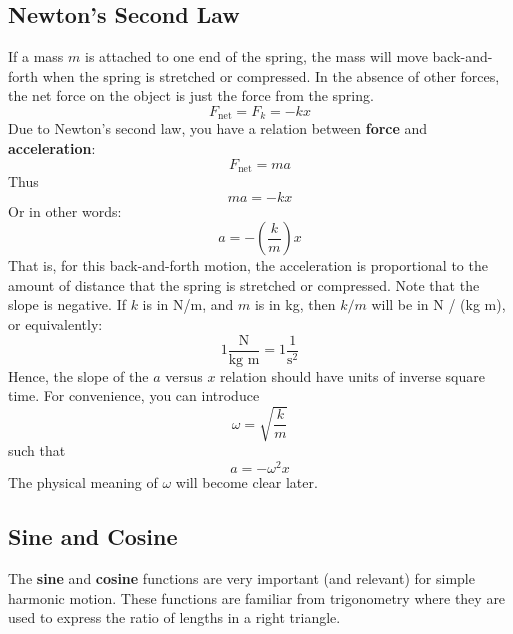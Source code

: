 \subsection{Newton's Second Law}
If a mass $m$ is attached to one end of the spring, the mass will move back-and-forth when the spring is stretched or compressed. In the absence of other forces, the net force on the object is just the force from the spring.
\begin{equation}
    F_{\text{net}} = F_{k} = -kx
\end{equation}
Due to Newton's second law, you have a relation between \textbf{force} and \textbf{acceleration}:
\begin{equation}
    F_{\text{net}} = m a
\end{equation}
Thus
\begin{equation}
    ma = -kx
\end{equation}
Or in other words:
\begin{equation}
    a = -\left( \frac{k}{m} \right) x
    \label{eq.11.ax}
\end{equation}
That is, for this back-and-forth motion, the acceleration is proportional to the amount of distance that the spring is stretched or compressed. Note that the slope is negative. If $k$ is in N/m, and $m$ is in kg, then $k/m$ will be in N / (kg m), or equivalently:
\begin{equation}
    1 \frac{\text{N}}{\text{kg m}} = 1 \frac{1}{\text{s}^{2}}
\end{equation}
Hence, the slope of the $a$ versus $x$ relation should have units of inverse square time. For convenience, you can introduce
\begin{equation}
    \omega = \sqrt{\frac{k}{m}}
\end{equation}
such that
\begin{equation}
    a = - \omega^{2} x
    \label{eq:11.axomega}
\end{equation}
The physical meaning of $\omega$ will become clear later.
\subsection{Sine and Cosine}
The \textbf{sine} and \textbf{cosine} functions are very important (and relevant) for simple harmonic motion. These functions are familiar from trigonometry where they are used to express the ratio of lengths in a right triangle.

